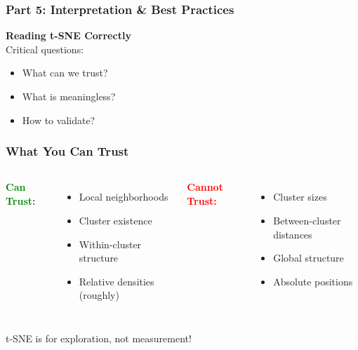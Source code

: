 \documentclass[aspectratio=169]{beamer}
\begin{document}
\begin{frame}
\frametitle{Part 5: Interpretation \& Best Practices}

\begin{center}
\LARGE{\textbf{Reading t-SNE Correctly}}\\[1cm]

Critical questions:
  \begin{itemize}
\item What can we trust?
  \item What is meaningless?
  \item How to validate?
  \end{itemize}
\end{center}

\end{frame}

\begin{frame}
\frametitle{What You Can Trust}

\begin{columns}
\textbf{\textcolor{green}{Can Trust:}}
\begin{itemize}
\item Local neighborhoods
\item Cluster existence
\item Within-cluster structure
\item Relative densities (roughly)
\end{itemize}

\textbf{\textcolor{red}{Cannot Trust:}}
\begin{itemize}
\item Cluster sizes
\item Between-cluster distances
\item Global structure
\item Absolute positions
\end{itemize}
\end{columns}

\vspace{0.5cm}
\centering
\colorbox{red!20}{t-SNE is for exploration, not measurement!}

\end{frame}
\end{document}
